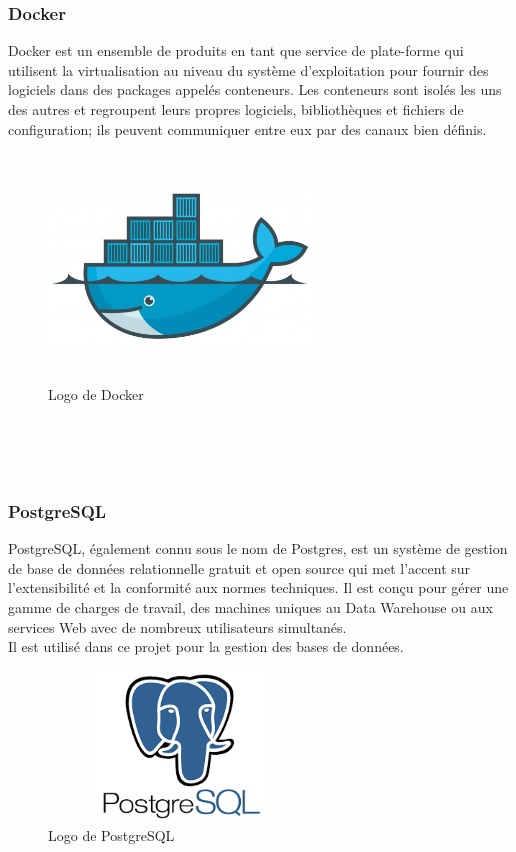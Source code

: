\subsubsection{Docker}
Docker est un ensemble de produits en tant que service de plate-forme qui utilisent la virtualisation au niveau du système d'exploitation pour fournir des logiciels dans des packages appelés conteneurs. Les conteneurs sont isolés les uns des autres et regroupent leurs propres logiciels, bibliothèques et fichiers de configuration; ils peuvent communiquer entre eux par des canaux bien définis.
\begin{figure}[H]
      \centering
        \includegraphics[width=7cm,height=6cm]{img/Docker_logo.jpeg}
        \caption{Logo de Docker}
\end{figure}

\\
\\
\\
\subsubsection*{PostgreSQL}
PostgreSQL, également connu sous le nom de Postgres, est un système de gestion de base de données relationnelle gratuit et open source qui met l'accent sur l'extensibilité et la conformité aux normes techniques. Il est conçu pour gérer une gamme de charges de travail, des machines uniques au Data Warehouse ou aux services Web avec de nombreux utilisateurs simultanés.\\
Il est utilisé dans ce projet pour la gestion des bases de données.
\begin{figure}[H]
      \centering
        \includegraphics[width=7cm,height=4cm]{img/PostgreSQL.png}
        \caption{Logo de PostgreSQL}
\end{figure}


